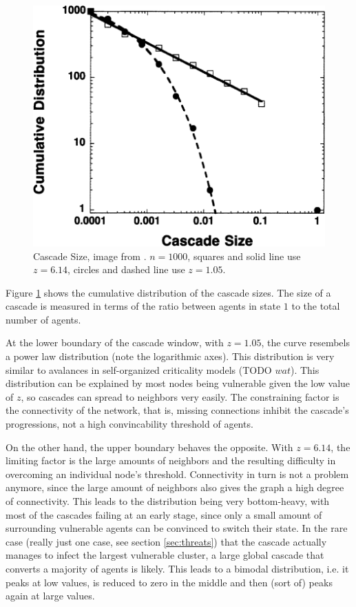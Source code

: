 \documentclass{sig-alternate-05-2015}
\begin{document}
\begin{figure}[h!]
  \centering
  \includegraphics[width=\columnwidth]{img/cascade-size}
  \caption{Cascade Size, image from \cite{simplemodel}. $n = 1000$, squares and solid line use $z = 6.14$, circles and dashed line use $z = 1.05$.}
  \label{fig:cascade-size}
\end{figure}

Figure \ref{fig:cascade-size} shows the cumulative distribution of the cascade sizes. The size of a cascade is measured in terms of the ratio between agents in state $1$ to the total number of agents.

At the lower boundary of the cascade window, with $z = 1.05$, the curve resembels a power law distribution (note the logarithmic axes). This distribution is very similar to avalances in self-organized criticality models (TODO $wat$). This distribution can be explained by most nodes being vulnerable given the low value of $z$, so cascades can spread to neighbors very easily. The constraining factor is the connectivity of the network, that is, missing connections inhibit the cascade's progressions, not a high convincability threshold of agents.

On the other hand, the upper boundary behaves the opposite. With $z = 6.14$, the limiting factor is the large amounts of neighbors and the resulting difficulty in overcoming an individual node's threshold. Connectivity in turn is not a problem anymore, since the large amount of neighbors also gives the graph a high degree of connectivity. This leads to the distribution being very bottom-heavy, with most of the cascades failing at an early stage, since only a small amount of surrounding vulnerable agents can be convinced to switch their state. In the rare case (really just one case, see section \ref{sec:threats}) that the cascade actually manages to infect the largest vulnerable cluster, a large global cascade that converts a majority of agents is likely. This leads to a bimodal distribution, i.e. it peaks at low values, is reduced to zero in the middle and then (sort of) peaks again at large values.
\end{document}
